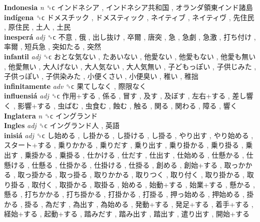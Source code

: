 \textbf{Indonesia} \emph{n}  ␝ϲ   インドネシア ,  インドネシア共和国 ,  オランダ領東インド諸島   \\
\textbf{indígena} ␝ϲ   ドメスチック ,  ドメスティック ,  ネイティブ ,  ネイティヴ ,  先住民 ,  原住民 ,  土人 ,  土民   \\
\textbf{inesperá} \emph{adj}  ␝ϲ   不意 ,  俄 ,  出し抜け ,  卒爾 ,  唐突 ,  急 ,  急劇 ,  急激 ,  打ち付け ,  率爾 ,  短兵急 ,  突如たる ,  突然   \\
\textbf{infantil} \emph{adj}  ␝ϲ   おとな気ない ,  たあいない ,  他愛ない ,  他愛もない ,  他愛も無い ,  他愛無い ,  大人げない ,  大人気ない ,  大人気無い ,  子どもっぽい ,  子供じみた ,  子供っぽい ,  子供染みた ,  小便くさい ,  小便臭い ,  稚い ,  稚拙   \\
\textbf{infinitamente} \emph{adv}  ␝ϲ   果てしなく ,  際限なく   \\
\textbf{influensiá} \emph{adj}  ␝ϲ   作用+する ,  係る ,  冒す ,  及す ,  及ぼす ,  左右+する ,  差し響く ,  影響+する ,  虫ばむ ,  虫食む ,  蝕む ,  触る ,  関る ,  関わる ,  障る ,  響く   \\
\textbf{Inglatera} \emph{n}  ␝ϲ   イングランド   \\
\textbf{Ingles} \emph{adj}  ␝ϲ   イングランド人 ,  英語   \\
\textbf{inisiá} \emph{adj}  ␝ϲ   し始める ,  し掛かる ,  し掛ける ,  し掛る ,  やり出す ,  やり始める ,  スタート+する ,  乗りかかる ,  乗りだす ,  乗り出す ,  乗り掛かる ,  乗り掛る ,  乗出す ,  乗掛かる ,  乗掛る ,  仕かける ,  仕だす ,  仕出す ,  仕始める ,  仕懸かる ,  仕懸ける ,  仕懸る ,  仕掛かる ,  仕掛ける ,  仕掛る ,  創める ,  創始+する ,  取っかかる ,  取っ掛かる ,  取っ掛る ,  取りかかる ,  取りつく ,  取り付く ,  取り掛かる ,  取り掛る ,  取付く ,  取掛かる ,  取掛る ,  始める ,  始動+する ,  始業+する ,  懸かる ,  懸る ,  打ちかかる ,  打ち掛かる ,  打掛かる ,  打掛る ,  押っ始める ,  押始める ,  掛かる ,  掛る ,  為だす ,  為出す ,  為始める ,  発動+する ,  発足+する ,  着手+する ,  経始+する ,  起動+する ,  踏みだす ,  踏み出す ,  踏出す ,  遣り出す ,  開始+する   \\

